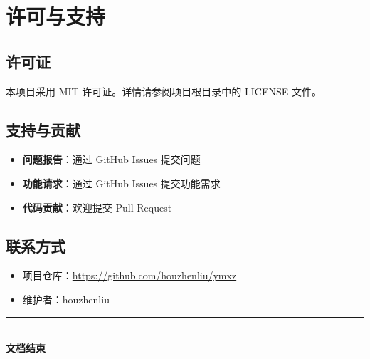\documentclass[a4paper, 12pt]{article}
\begin{document}
\section{许可与支持}

\subsection{许可证}
本项目采用 MIT 许可证。详情请参阅项目根目录中的 LICENSE 文件。

\subsection{支持与贡献}
\begin{itemize}
    \item \textbf{问题报告}：通过 GitHub Issues 提交问题
    \item \textbf{功能请求}：通过 GitHub Issues 提交功能需求
    \item \textbf{代码贡献}：欢迎提交 Pull Request
\end{itemize}

\subsection{联系方式}
\begin{itemize}
    \item 项目仓库：\url{https://github.com/houzhenliu/ymxz}
    \item 维护者：houzhenliu
\end{itemize}

\vspace{1cm}
\begin{center}
\rule{0.5\linewidth}{0.5pt}\\
\textbf{文档结束}
\end{center}
\end{document}
